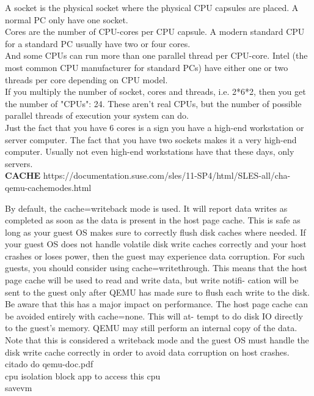 \documentclass[11pt, a4paper, oneside]{article}
\theoremstyle{definition}
\begin{document}
A socket is the physical socket where the physical CPU capsules are placed. A normal PC only have one socket.\\
Cores are the number of CPU-cores per CPU capsule. A modern standard CPU for a standard PC usually have two or four cores.\\
And some CPUs can run more than one parallel thread per CPU-core. Intel (the most common CPU manufacturer for standard PCs) have either one or two threads per core depending on CPU model.\\
If you multiply the number of socket, cores and threads, i.e. 2*6*2, then you get the number of "CPUs": 24. These aren't real CPUs, but the number of possible parallel threads of execution your system can do.\\
Just the fact that you have 6 cores is a sign you have a high-end workstation or server computer. The fact that you have two sockets makes it a very high-end computer. Usually not even high-end workstations have that these days, only servers.\\


\textbf{CACHE}
https://documentation.suse.com/sles/11-SP4/html/SLES-all/cha-qemu-cachemodes.html

By default, the cache=writeback mode is used. It will report data writes as
completed as soon as the data is present in the host page cache. This is safe as
long as your guest OS makes sure to correctly flush disk caches where needed.
If your guest OS does not handle volatile disk write caches correctly and your
host crashes or loses power, then the guest may experience data corruption.
For such guests, you should consider using cache=writethrough. This means
that the host page cache will be used to read and write data, but write notifi-
cation will be sent to the guest only after QEMU has made sure to flush each
write to the disk. Be aware that this has a major impact on performance.
The host page cache can be avoided entirely with cache=none. This will at-
tempt to do disk IO directly to the guest’s memory. QEMU may still perform
an internal copy of the data. Note that this is considered a writeback mode
and the guest OS must handle the disk write cache correctly in order to avoid
data corruption on host crashes. citado do qemu-doc.pdf\\

cpu isolation block app to access this cpu\\

savevm\\
\end{document}
